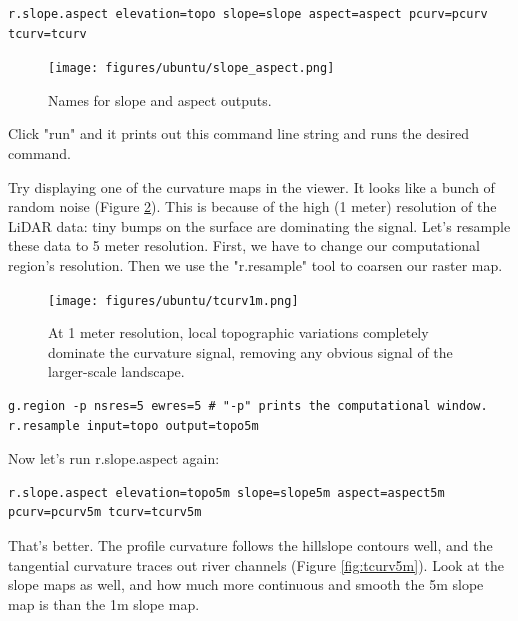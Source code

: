 \documentclass{book}
\begin{document}
\begin{lstlisting}
r.slope.aspect elevation=topo slope=slope aspect=aspect pcurv=pcurv tcurv=tcurv
\end{lstlisting}

\begin{figure}[h]
 \begin{center}
 \texttt{[image: figures/ubuntu/slope\_aspect.png]}
 \caption{Names for slope and aspect outputs.}
 \label{fig:slope_aspect}
 \end{center}
\end{figure}

Click "run" and it prints out this command line string and runs the desired command.

Try displaying one of the curvature maps in the viewer. It looks like a bunch of random noise (Figure \ref{fig:tcurv1m}). This is because of the high (1 meter) resolution of the LiDAR data: tiny bumps on the surface are dominating the signal. Let's resample these data to 5 meter resolution. First, we have to change our computational region's resolution. Then we use the "r.resample" tool to coarsen our raster map.

\begin{figure}[h]
 \begin{center}
 \texttt{[image: figures/ubuntu/tcurv1m.png]}
 \caption{At 1 meter resolution, local topographic variations completely dominate the curvature signal, removing any obvious signal of the larger-scale landscape.}
 \label{fig:tcurv1m}
 \end{center}
\end{figure}


\begin{lstlisting}
g.region -p nsres=5 ewres=5 # "-p" prints the computational window.
r.resample input=topo output=topo5m
\end{lstlisting}

Now let's run r.slope.aspect again:

\begin{lstlisting}
r.slope.aspect elevation=topo5m slope=slope5m aspect=aspect5m pcurv=pcurv5m tcurv=tcurv5m
\end{lstlisting}

That's better. The profile curvature follows the hillslope contours well, and the tangential curvature traces out river channels (Figure \ref{fig:tcurv5m}). Look at the slope maps as well, and how much more continuous and smooth the 5m slope map is than the 1m slope map.
\end{document}
